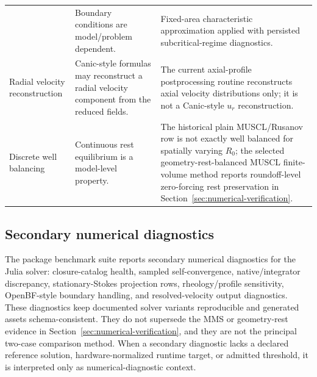 \begin{table}[!htb]
\begin{tabularx}{\textwidth}{@{}
        >{\raggedright\arraybackslash}p{}
        >{\raggedright\arraybackslash}p{}
        >{\raggedright\arraybackslash}X@{}}
            & Boundary conditions are model/problem dependent.
            & Fixed-area characteristic approximation applied with persisted
            subcritical-regime diagnostics. \\
        Radial velocity reconstruction
            & Canic-style formulas may reconstruct a radial velocity component
            from the reduced fields.
            & The current axial-profile postprocessing routine reconstructs axial velocity
            distributions only; it is not a Canic-style $u_r$ reconstruction. \\
        Discrete well balancing
            & Continuous rest equilibrium is a model-level property.
            & The historical plain MUSCL/Rusanov row is not exactly well
            balanced for spatially varying $R_0$; the selected
            geometry-rest-balanced MUSCL finite-volume method reports
            roundoff-level zero-forcing rest preservation in
            Section~\ref{sec:numerical-verification}. \\
        \bottomrule
    \end{tabularx}
\end{table}

\subsection{Secondary numerical diagnostics}
\label{app:num-secondary-implementation-checks}
\label{subsec:verification-reproducibility}
\label{subsec:package-benchmark-suite}

The package benchmark suite reports secondary numerical diagnostics for the
Julia solver: closure-catalog health, sampled self-convergence,
native/integrator discrepancy, stationary-Stokes projection rows,
rheology/profile sensitivity, OpenBF-style boundary handling, and
resolved-velocity output diagnostics. These diagnostics keep documented solver
variants reproducible and generated assets schema-consistent. They do not supersede
the MMS or geometry-rest evidence in Section~\ref{sec:numerical-verification},
and they are not the principal two-case comparison method. When a secondary
diagnostic lacks a declared reference solution, hardware-normalized runtime
target, or admitted threshold, it is interpreted only as numerical-diagnostic
context.


